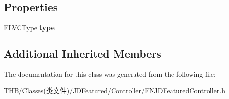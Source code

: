 \subsection*{Properties}
\begin{DoxyCompactItemize}
\item 
\mbox{\label{interface_f_n_j_d_featured_controller_a58555cd3748795b94e8a14fe9e2c085a}} 
F\+L\+V\+C\+Type {\bfseries type}
\end{DoxyCompactItemize}
\subsection*{Additional Inherited Members}


The documentation for this class was generated from the following file\+:\begin{DoxyCompactItemize}
\item 
T\+H\+B/\+Classes(类文件)/\+J\+D\+Featured/\+Controller/F\+N\+J\+D\+Featured\+Controller.\+h\end{DoxyCompactItemize}
